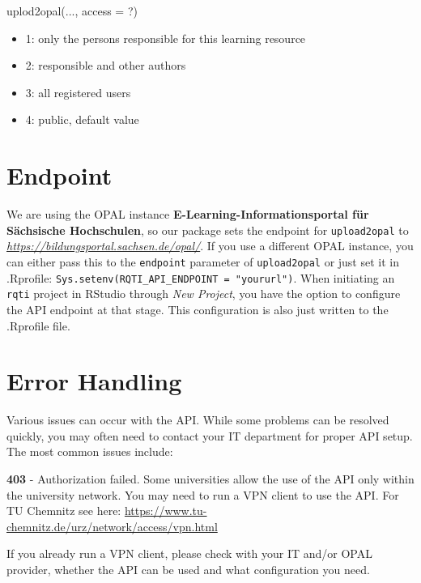 \documentclass[twoside]{tufte-book}
\newenvironment{Shaded}{}{}
\newcommand{\AttributeTok}[1]{\textcolor[rgb]{0.49,0.56,0.16}{#1}}
\newcommand{\FunctionTok}[1]{\textcolor[rgb]{0.02,0.16,0.49}{#1}}
\newcommand{\NormalTok}[1]{#1}
\providecommand{\tightlist}{%
  \setlength{\itemsep}{0pt}\setlength{\parskip}{0pt}}
\begin{document}
\begin{Shaded}
\begin{Highlighting}[]
\FunctionTok{uplod2opal}\NormalTok{(..., }\AttributeTok{access =}\NormalTok{ ?)}
\end{Highlighting}
\end{Shaded}

\begin{itemize}
\tightlist
\item
  1: only the persons responsible for this learning resource
\item
  2: responsible and other authors
\item
  3: all registered users
\item
  4: public, default value
\end{itemize}

\section{Endpoint}\label{endpoint}

We are using the OPAL instance \textbf{E-Learning-Informationsportal für Sächsische Hochschulen}, so our package sets the endpoint for \texttt{upload2opal} to \emph{\url{https://bildungsportal.sachsen.de/opal/}}. If you use a different OPAL instance, you can either pass this to the \texttt{endpoint} parameter of \texttt{upload2opal} or just set it in .Rprofile: \texttt{Sys.setenv(RQTI\_API\_ENDPOINT\ =\ "yoururl")}. When initiating an \texttt{rqti} project in RStudio through \emph{New Project}, you have the option to configure the API endpoint at that stage. This configuration is also just written to the .Rprofile file.

\section{Error Handling}\label{error-handling}

Various issues can occur with the API. While some problems can be resolved quickly, you may often need to contact your IT department for proper API setup. The most common issues include:

\textbf{403} - Authorization failed. Some universities allow the use of the API only within the university network. You may need to run a VPN client to use the API.
For TU Chemnitz see here: \url{https://www.tu-chemnitz.de/urz/network/access/vpn.html}

If you already run a VPN client, please check with your IT and/or OPAL provider, whether the API can be used and what configuration you need.
\end{document}
